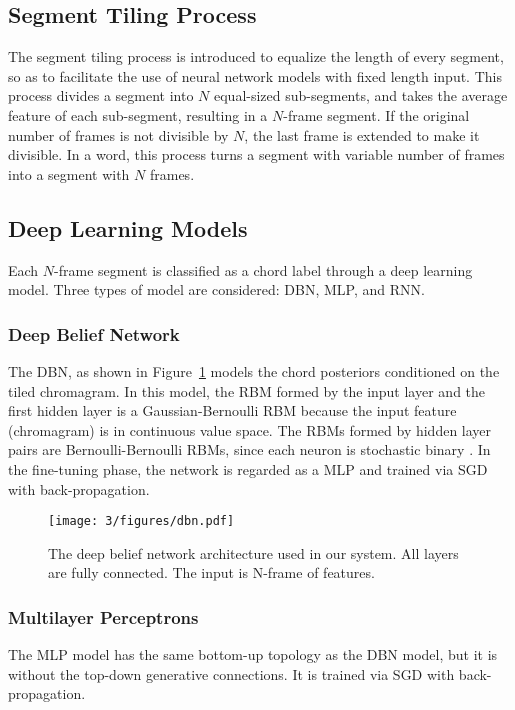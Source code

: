 \subsection{Segment Tiling Process} \label{sec:3-seg-tile}

The segment tiling process is introduced to equalize the length of every segment, so as to facilitate the use of neural network models with fixed length input. This process divides a segment into $N$ equal-sized sub-segments, and takes the average feature of each sub-segment, resulting in a $N$-frame segment. If the original number of frames is not divisible by $N$, the last frame is extended to make it divisible. In a word, this process turns a segment with variable number of frames into a segment with $N$ frames.

\subsection{Deep Learning Models} \label{sec:3-dlmodel}

Each $N$-frame segment is classified as a chord label through a deep learning model. Three types of model are considered: DBN, MLP, and RNN.

\subsubsection{Deep Belief Network}

The DBN, as shown in Figure~\ref{fig:3-dbn} models the chord posteriors conditioned on the tiled chromagram. In this model, the RBM formed by the input layer and the first hidden layer is a Gaussian-Bernoulli RBM because the input feature (chromagram) is in continuous value space. The RBMs formed by hidden layer pairs are Bernoulli-Bernoulli RBMs, since each neuron is stochastic binary \cite{hinton2006reducing}. In the fine-tuning phase, the network is regarded as a MLP and trained via SGD with back-propagation.

\begin{figure}[htb]
\centering
\texttt{[image: 3/figures/dbn.pdf]}
\caption{The deep belief network architecture used in our system. All layers are fully connected. The input is N-frame of features.}
\label{fig:3-dbn}
\end{figure}

\subsubsection{Multilayer Perceptrons}
The MLP model has the same bottom-up topology as the DBN model, but it is without the top-down generative connections. It is trained via SGD with back-propagation.


